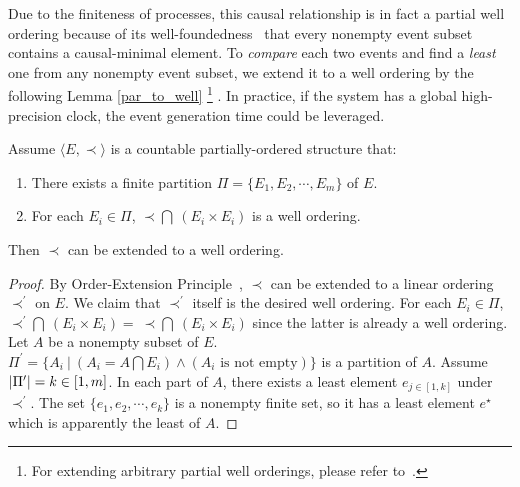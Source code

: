 \documentclass[a4paper,USenglish]{lipics-v2016}
\newcommand{\evts}{\textit{E}}
\newcommand{\mybigvert}{ \ \vert \ }
\begin{document}
Due to the finiteness of processes, this causal relationship is in fact a partial well ordering because of its well-foundedness~\cite{Enderton77} that every nonempty event subset contains a causal-minimal element.
To \textit{compare} each two events and find a \textit{least} one from any nonempty event subset,
we extend it to a well ordering
by the following Lemma \ref{par_to_well}
\footnote
{
	For extending arbitrary partial well orderings, please refer to~\cite{Lin-well2015}.
}
.
In practice, if the system has a global high-precision clock,
the event generation time could be leveraged.

\begin{lemma}\label{par_to_well}
	Assume $\langle \evts, \prec \rangle$ is a countable partially-ordered structure that:
	\begin{enumerate}[(1)]
		\item
		There exists a finite partition $\Pi = \{\evts_1, \evts_2, \cdots, \evts_m\}$ of $\evts$.
		\item
		For each $\evts_i \in \Pi$, $\prec \bigcap \ (\evts_i \times \evts_i)$ is a well ordering. 
	\end{enumerate}
	Then $\prec$ can be extended to a well ordering.
\end{lemma}
\begin{proof}
	By Order-Extension Principle~\cite{Szpilrajn30}, $\prec$ can be extended to a linear ordering $\prec^\prime$ on $\evts$.
	We claim that $\prec^\prime$ itself is the desired well ordering.
	For each $E_i \in \Pi$, $\prec^\prime \bigcap \ (\evts_i \times \evts_i) = \ \prec \bigcap \ (\evts_i \times \evts_i)$
	since the latter is already a well ordering.
	Let $A$ be a nonempty subset of $\evts$.
	$\Pi^\prime = \{A_i \mybigvert (A_i = A \bigcap \evts_i) \land (A_i \text{ is not empty})\}$ is a partition of $A$.
	Assume $\arrowvert \Pi^\prime \arrowvert = k \in [1, m]$.
	In each part of $A$, there exists a least element $e_{j \in [1, k]}$ under $\prec^\prime$.
	The set $\{e_1, e_2, \cdots, e_k\}$ is a nonempty finite set,
	so it has a least element $e^\star$ which is apparently the least of $A$.
\end{proof}
\end{document}
